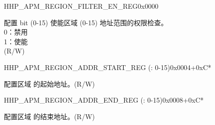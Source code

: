 \begin{register}{H}{HP\_APM\_REGION\_FILTER\_EN\_REG}{0x0000}\label{regdesc:HPAPMREGIONFILTERENREG}
%
%
\regnewline%
\begin{regdesc}\begin{reglist}
\label{fielddesc:HPAPMREGIONFILTEREN}\item [HP\_APM\_REGION\_FILTER\_EN] 配置 bit  (0-15) 使能区域  (0-15) 地址范围的权限检查。\\
0：禁用 \\
1：使能  \\ (R/W)
\end{reglist}\end{regdesc}
\end{register}


\begin{register}{H}{HP\_APM\_REGION\_ADDR\_START\_REG (: 0-15)}{0x0004+0xC*}\label{regdesc:HPAPMREGIONNADDRSTARTREG}
%
\regnewline%
\begin{regdesc}\begin{reglist}
\label{fielddesc:HPAPMREGIONNADDRSTART}\item [HP\_APM\_REGION\regindex{n}\_ADDR\_START] 配置区域  的起始地址。(R/W)
\end{reglist}\end{regdesc}
\end{register}


\begin{register}{H}{HP\_APM\_REGION\_ADDR\_END\_REG (: 0-15)}{0x0008+0xC*}\label{regdesc:HPAPMREGIONNADDRENDREG}
%
\regnewline%
\begin{regdesc}\begin{reglist}
\label{fielddesc:HPAPMREGIONNADDREND}\item [HP\_APM\_REGION\regindex{n}\_ADDR\_END] 配置区域  的结束地址。(R/W)
\end{reglist}\end{regdesc}
\end{register}



